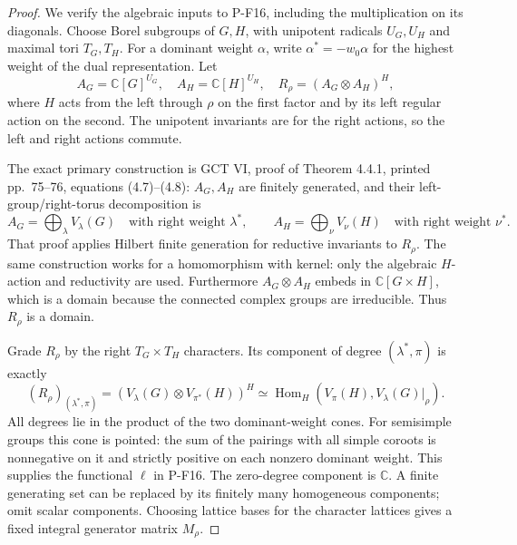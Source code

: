 \begin{proof}
We verify the algebraic inputs to P-F16, including the multiplication
on its diagonals. Choose Borel subgroups of $G,H$, with unipotent
radicals $U_G,U_H$ and maximal tori $T_G,T_H$.
For a dominant weight $\alpha$, write
$\alpha^*=-w_0\alpha$ for the highest weight of the dual representation.
Let
\[
 A_G=\mathbb C[G]^{U_G},\quad
 A_H=\mathbb C[H]^{U_H},\quad
 R_\rho=(A_G\otimes A_H)^H,
 \tag{P-F17c}
\]
where $H$ acts from the left through $\rho$ on the first factor and
by its left regular action on the second. The unipotent invariants
are for the right actions, so the left and right actions commute.

The exact primary construction is GCT VI, proof of Theorem 4.4.1,
printed pp.~75--76, equations (4.7)--(4.8): $A_G,A_H$ are finitely
generated, and their left-group/right-torus decomposition is
\[
 A_G=\bigoplus_{\lambda}V_\lambda(G)
       \quad\text{with right weight }\lambda^*,\qquad
 A_H=\bigoplus_{\nu}V_\nu(H)
       \quad\text{with right weight }\nu^*.
\]
That proof applies Hilbert finite generation for reductive invariants
to $R_\rho$. The same construction works for a homomorphism with
kernel: only the algebraic $H$-action and reductivity are used.
Furthermore $A_G\otimes A_H$ embeds in $\mathbb C[G\times H]$,
which is a domain because the connected complex groups are
irreducible. Thus $R_\rho$ is a domain.

Grade $R_\rho$ by the right $T_G\times T_H$ characters. Its component
of degree $(\lambda^*,\pi)$ is exactly
\[
 (R_\rho)_{(\lambda^*,\pi)}
   =(V_\lambda(G)\otimes V_{\pi^*}(H))^H
   \simeq\operatorname{Hom}_H(V_\pi(H),V_\lambda(G)|_\rho).
 \tag{P-F17d}
\]
All degrees lie in the product of the two dominant-weight cones.
For semisimple groups this cone is pointed: the sum of the pairings
with all simple coroots is nonnegative on it and strictly positive
on each nonzero dominant weight. This supplies the functional $\ell$
in P-F16. The zero-degree component is $\mathbb C$. A finite generating
set can be replaced by its finitely many homogeneous components;
omit scalar components. Choosing lattice bases for the character
lattices gives a fixed integral generator matrix $M_\rho$.


\end{proof}

